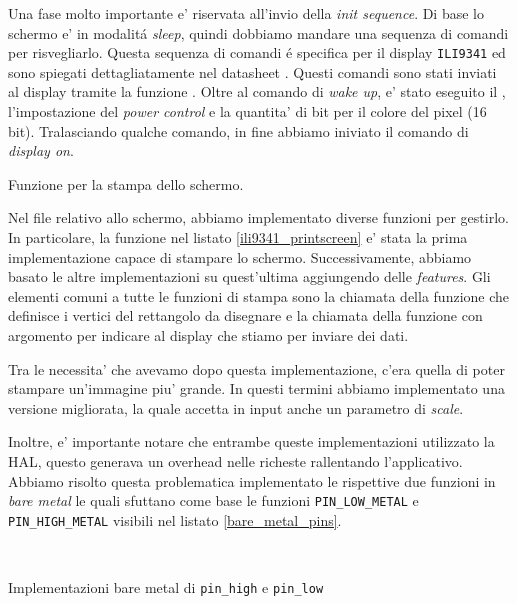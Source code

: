 \documentclass[a4paper]{article}
\begin{document}
Una fase molto importante e' riservata all'invio della \textit{init sequence}.
Di base lo schermo e' in modalitá \textit{sleep}, quindi dobbiamo mandare una sequenza di comandi per risvegliarlo. Questa sequenza di comandi é specifica per il display \texttt{ILI9341} ed sono spiegati dettagliatamente nel datasheet \cite{ili9341}. Questi comandi sono stati inviati al display tramite la funzione . Oltre al comando di \textit{wake up}, e' stato eseguito il , l'impostazione del \textit{power control} e la quantita' di bit per il colore del pixel (16 bit). Tralasciando qualche comando, in fine abbiamo iniviato il comando di \textit{display on}.

\begin{Listing}[h!t] %
    \centering
    \caption{Funzione per la stampa dello schermo.}
    \label{ili9341_printscreen}
\end{Listing}

Nel file relativo allo schermo, abbiamo implementato diverse funzioni per gestirlo. In particolare, la funzione nel listato \ref{ili9341_printscreen} e' stata la prima implementazione capace di stampare lo schermo. Successivamente, abbiamo basato le altre implementazioni su quest'ultima aggiungendo delle \textit{features}.
Gli elementi comuni a tutte le funzioni di stampa sono la chiamata della funzione  che definisce i vertici del rettangolo da disegnare e la chiamata della funzione  con argomento  per indicare al display che stiamo per inviare dei dati.

Tra le necessita' che avevamo dopo questa implementazione, c'era quella di poter stampare un'immagine piu' grande. In questi termini abbiamo implementato una versione migliorata, la quale accetta in input anche un parametro di \textit{scale}.

Inoltre, e' importante notare che entrambe queste implementazioni utilizzato la HAL, questo generava un overhead nelle richeste rallentando l'applicativo. Abbiamo risolto questa problematica implementato le rispettive due funzioni in \textit{bare metal} le quali sfuttano come base le funzioni \texttt{PIN\_LOW\_METAL} e \texttt{PIN\_HIGH\_METAL} visibili nel listato \ref{bare_metal_pins}.

\begin{Listing}
    \centering
    \mbox{
        \quad
    }
    \caption{Implementazioni bare metal di \texttt{pin\_high} e \texttt{pin\_low}}
    \label{bare_metal_pins}
\end{Listing}
\end{document}
